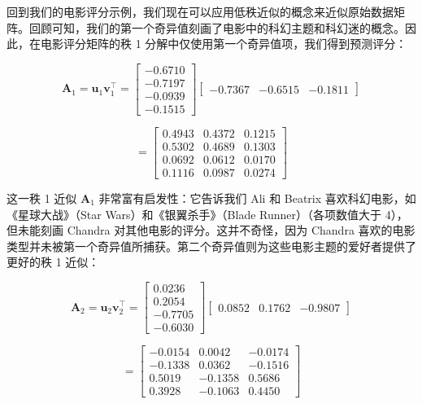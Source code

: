 \begin{notebox}
回到我们的电影评分示例，我们现在可以应用低秩近似的概念来近似原始数据矩阵。回顾可知，我们的第一个奇异值刻画了电影中的科幻主题和科幻迷的概念。因此，在电影评分矩阵的秩 1 分解中仅使用第一个奇异值项，我们得到预测评分：

\begin{equation}
\boldsymbol{A}_1 = \boldsymbol{u}_1 \boldsymbol{v}_1^\top = \begin{bmatrix} -0.6710 \\ -0.7197 \\ -0.0939 \\ -0.1515 \end{bmatrix} \begin{bmatrix} -0.7367 & -0.6515 & -0.1811 \end{bmatrix}
\tag{4.100a}\label{eq:4-100a}
\end{equation}

\begin{equation}
= \begin{bmatrix} 0.4943 & 0.4372 & 0.1215 \\ 0.5302 & 0.4689 & 0.1303 \\ 0.0692 & 0.0612 & 0.0170 \\ 0.1116 & 0.0987 & 0.0274 \end{bmatrix}
\tag{4.100b}\label{eq:4-100b}
\end{equation}

这一秩 1 近似 $ \boldsymbol{A}_1 $ 非常富有启发性：它告诉我们 Ali 和 Beatrix 喜欢科幻电影，如《星球大战》（Star Wars）和《银翼杀手》（Blade Runner）（各项数值大于 4），但未能刻画 Chandra 对其他电影的评分。这并不奇怪，因为 Chandra 喜欢的电影类型并未被第一个奇异值所捕获。第二个奇异值则为这些电影主题的爱好者提供了更好的秩 1 近似：

\begin{equation}
\boldsymbol{A}_2 = \boldsymbol{u}_2 \boldsymbol{v}_2^\top = \begin{bmatrix} 0.0236 \\ 0.2054 \\ -0.7705 \\ -0.6030 \end{bmatrix} \begin{bmatrix} 0.0852 & 0.1762 & -0.9807 \end{bmatrix}
\tag{4.101a}\label{eq:4-101a}
\end{equation}

\begin{equation}
= \begin{bmatrix} -0.0154 & 0.0042 & -0.0174 \\ -0.1338 & 0.0362 & -0.1516 \\ 0.5019 & -0.1358 & 0.5686 \\ 0.3928 & -0.1063 & 0.4450 \end{bmatrix}
\tag{4.101b}\label{eq:4-101b}
\end{equation}


\end{notebox}
